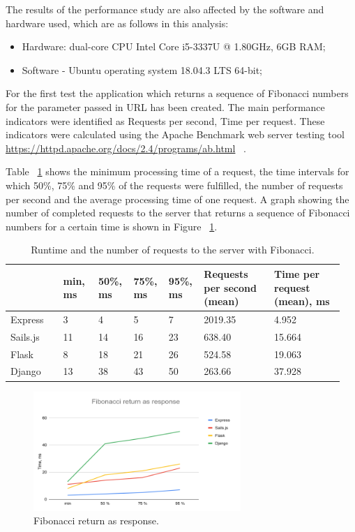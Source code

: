 \documentclass[runningheads]{llncs}
\begin{document}
The results of the performance study are also affected by the software and hardware used, which are as follows in this analysis:

\begin{itemize}
	\item Hardware: dual-core CPU Intel Core i5-3337U @ 1.80GHz, 6GB RAM;
	\item Software - Ubuntu operating system 18.04.3 LTS 64-bit; 
\end{itemize}
For the first test the application which returns a sequence of Fibonacci numbers for the parameter passed in URL has been created. The main performance indicators were identified as Requests per second, Time per request. These indicators were calculated using the Apache Benchmark web server testing tool \url{https://httpd.apache.org/docs/2.4/programs/ab.html} ~\cite{ref_url4}. 

Table ~\ref{tab3} shows the minimum processing time of a request, the time intervals for which 50\%, 75\% and 95\% of the requests were fulfilled, the number of requests per second and the average processing time of one request. A graph showing the number of completed requests to the server that returns a sequence of Fibonacci numbers for a certain time is shown in Figure ~\ref{fig3}.

\begin{table}
\caption{ Runtime and the number of requests to the server with Fibonacci.}\label{tab3}
\begin{tabular}{|p{0.15\linewidth}|p{0.1\linewidth}|p{0.1\linewidth}|p{0.1\linewidth}|p{0.1\linewidth}|p{0.2\linewidth}|p{0.2\linewidth}|}
\hline
& min, ms & 50\%, ms & 75\%, ms & 95\%, ms & Requests per second (mean) & Time per request (mean), ms\\
\hline
Express & 3 & 4 & 5 & 7 & 2019.35 & 4.952 \\
\hline
Sails.js & 11 & 14 & 16 & 23 & 638.40 & 15.664 \\
\hline
Flask & 8 & 18 & 21 & 26 & 524.58& 19.063 \\
\hline
Django & 13 & 38 & 43 & 50 & 263.66 & 37.928\\
\hline
\end{tabular}
\end{table}


\begin{figure}
    \centering
        \includegraphics[width=0.7\textwidth]{fig-3.png}
    \caption{Fibonacci return as response.} \label{fig3}
\end{figure}
\end{document}
